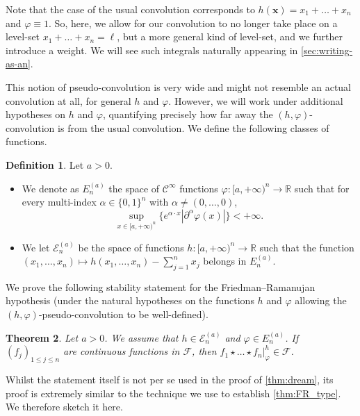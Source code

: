 \documentclass[12pt,twoside]{article}
\theoremstyle{theorem}
\newtheorem{thm}{Theorem}[section]
\theoremstyle{remark}
\theoremstyle{definition}
\newtheorem{defi}[thm]{Definition}
\theoremstyle{example}
\newcommand{\R}{\mathbb{R}}
\newcommand{\x}{\mathbf{x}}
\newcommand{\1}[1]{\mathds{1}_{#1}}
\newcommand{\cF}{\mathcal{F}}
\newcommand{\cE}{\mathcal{E}}
\begin{document}
 Note that the case of the usual convolution corresponds to $h(\x)=x_1+\ldots+x_n$ and
 $\varphi \equiv 1$.  So, here, we allow for our convolution to no longer take place on a level-set
 $x_1 + \ldots + x_n=\ell$, but a more general kind of level-set, and we further introduce a
 weight. We will see such integrals naturally appearing in \cref{sec:writing-as-an}.

 This notion of pseudo-convolution is very wide and might not resemble an actual convolution at all,
 for general $h$ and $\varphi$. However, we will work under additional hypotheses on $h$ and
 $\varphi$, quantifying precisely how far away the $(h,\varphi)$-convolution is from the usual
 convolution. We define the following classes of functions.
  
 \begin{defi} \label{def:Ena} Let $a>0$.
   \begin{itemize}
   \item We denote as $E_n^{(a)}$ the space of $\mathcal{C}^\infty$ functions
     $\varphi : [a, +\infty)^n \rightarrow \R$ such that for every multi-index
     $\alpha\in \{0, 1\}^n$ with $\alpha\not=(0,\ldots, 0)$,
     \begin{equation}
       \sup_{x \in [a, +\infty)^n}\Big\{ e^{\alpha \cdot x}|\partial^\alpha \varphi(x)|\Big\} <+\infty.
     \end{equation}
   \item We let $\cE_n^{(a)}$ be the  space of functions $h : [a, + \infty)^n \rightarrow \R$
     such that the function $ (x_1, \ldots, x_n) \mapsto h(x_1, \ldots, x_n) - \sum_{j=1}^n x_j $
     belongs in $E_n^{(a)}$.
\end{itemize}
\end{defi}

We prove the following stability statement for the Friedman--Ramanujan hypothesis (under the natural
hypotheses on the functions $h$ and $\varphi$ allowing the $(h,\varphi)$-pseudo-convolution to be
well-defined).
 
\begin{thm} \label{t:intermediate} Let $a>0$. We assume that $h\in \cE_n^{(a)}$ and 
  $\varphi\in E_n^{(a)}$.  If $(f_j)_{1 \leq j \leq n}$ are continuous functions in $\cF$, then
  $ f_1\star \ldots \star f_n |^h_\varphi\in \cF$.
 \end{thm}

 Whilst the statement itself is not per se used in the proof of \cref{thm:dream}, its proof is
 extremely similar to the technique we use to establish \cref{thm:FR_type}. We therefore sketch it
 here.
\end{document}
